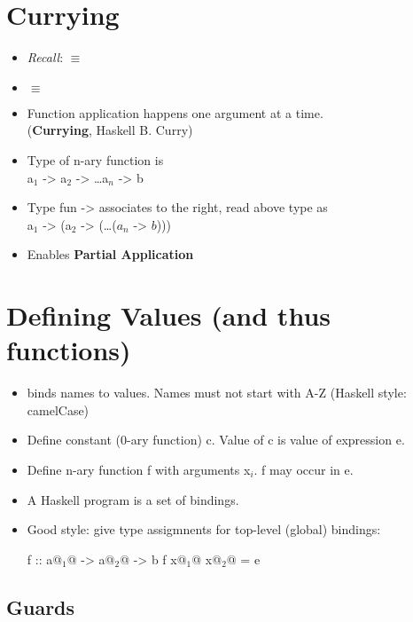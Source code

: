\section{Currying}

\begin{itemize}
  \item \textit{Recall}:  $\equiv$ 
  \item {} $\equiv$ 
  \item Function application happens one argument at a time. \\ (\textbf{Currying}, Haskell B. Curry)
  \item Type of n-ary function is \\ a$_1$ -> a$_2$ -> \dots a$_n$ -> b
  \item Type fun -> associates to the right, read above type as \\ a$_1$ -> (a$_2$ -> (\dots ($a_n$ -> $b$)))
  \item Enables \textbf{Partial Application}
\end{itemize}


\section{Defining Values (and thus functions)}

\begin{itemize}
  \item \codeline{=} binds names to values. Names must not start with A-Z (Haskell style: camelCase)
  \item Define constant (0-ary function) c. Value of c is value of expression e. \\ 
  \item Define n-ary function f with arguments x$_i$. f may occur in e. \\ 
  \item A Haskell program is a set of bindings.
  \item Good style: give type assigmnents for top-level (global) bindings: 
  \begin{codebox}[haskell]
f :: a@$_1$@ -> a@$_2$@ -> b
f x@$_1$@ x@$_2$@ = e
  \end{codebox}
\end{itemize}

\subsection{Guards}

